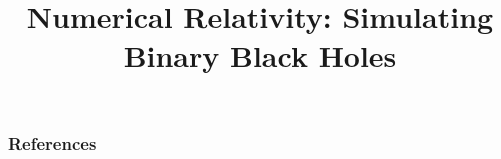 \documentclass[aspectratio=169]{beamer}
\title{Numerical Relativity: Simulating Binary Black Holes}
\begin{document}
  \frame{\titlepage}

  \begin{frame}
    \frametitle{References}
    \scriptsize
    \begin{multicols}{2}
      \nocite{*}
      
    \end{multicols}
  \end{frame}
\end{document}
